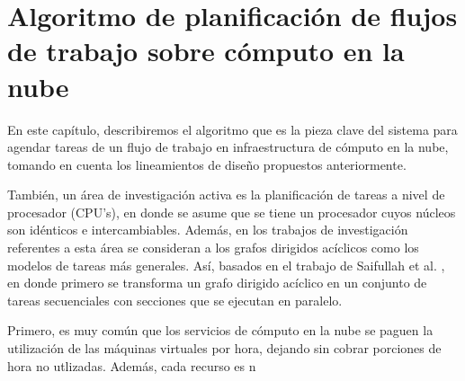 \chapter{Algoritmo de planificación de flujos de trabajo sobre cómputo en la nube}

En este capítulo, describiremos el algoritmo que es la pieza clave del sistema para agendar tareas de un flujo de trabajo en infraestructura de cómputo en la nube, tomando en cuenta los lineamientos de diseño propuestos anteriormente.

También, un área de investigación activa es la planificación de tareas a nivel de procesador (CPU's), en donde se asume que se tiene un procesador cuyos núcleos son idénticos e intercambiables. Además, en los trabajos de investigación referentes a esta área se consideran a los grafos dirigidos acíclicos como los modelos de tareas más generales. Así, basados en el trabajo de Saifullah et al. \cite{saifullah2013multi}, en donde primero se transforma un grafo dirigido acíclico en un conjunto de tareas secuenciales con secciones que se ejecutan en paralelo.

Primero, es muy común que los servicios de cómputo en la nube se paguen la utilización de las máquinas virtuales por hora, dejando sin cobrar porciones de hora no utlizadas. Además, cada recurso es n










